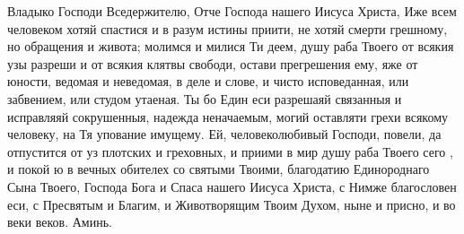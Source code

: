 \begin{mymulticols}

Владыко Господи Вседержителю, Отче Господа нашего Иисуса Христа, Иже всем человеком хотяй спастися и в разум истины приити, не хотяй смерти грешному, но обращения и живота; молимся и милися Ти деем, душу раба Твоего  от всякия узы разреши и от всякия клятвы свободи, остави прегрешения ему, яже от юности, ведомая и неведомая, в деле и слове, и чисто исповеданная, или забвением, или студом утаеная. Ты бо Един еси разрешаяй связанныя и исправляяй сокрушенныя, надежда неначаемым, могий оставляти грехи всякому человеку, на Тя упование имущему. Ей, человеколюбивый Господи, повели, да отпустится от уз плотских и греховных, и приими в мир душу раба Твоего сего , и покой ю в вечных обителех со святыми Твоими, благодатию Единороднаго Сына Твоего, Господа Бога и Спаса нашего Иисуса Христа, с Нимже благословен еси, с Пресвятым и Благим, и Животворящим Твоим Духом, ныне и присно, и во веки веков. Аминь.

\end{mymulticols}

\mychapterending


